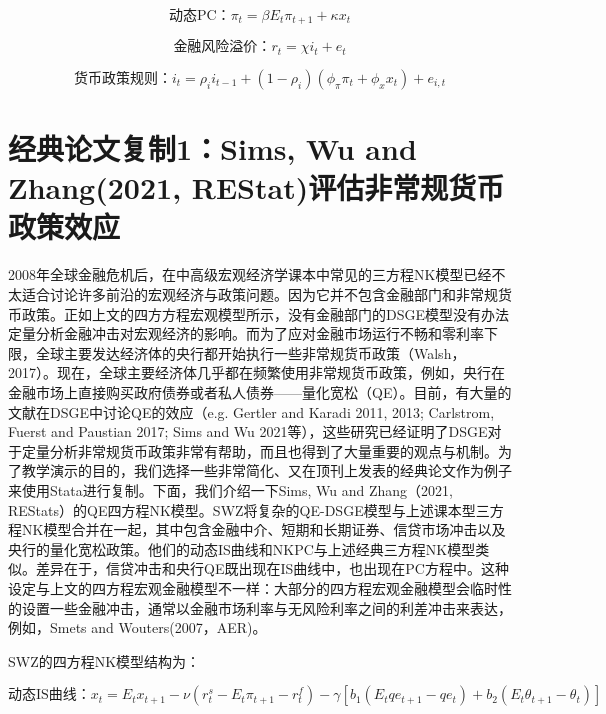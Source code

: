 \documentclass[cn,12pt,math=newtx,citestyle=gb7714-2015,bibstyle=gb7714-2015]{elegantbook}
\begin{document}
	
	\begin{equation}
		\text{动态PC：}\pi_t =\beta E_t \pi_{t+1} + \kappa x_t
	\end{equation}
	
		\begin{equation}
		\text{金融风险溢价：}r_t =\chi i_{t} + e_t
	\end{equation}
	
	\begin{equation}
		\text{货币政策规则：} i_t =\rho_i i_{t-1} + (1-\rho_i)(\phi_\pi \pi_{t} + \phi_x x_t) + e_{i,t}
	\end{equation}
	
		
	
	\section{经典论文复制1：Sims, Wu and Zhang(2021, REStat)评估非常规货币政策效应}
	
	2008年全球金融危机后，在中高级宏观经济学课本中常见的三方程NK模型已经不太适合讨论许多前沿的宏观经济与政策问题。因为它并不包含金融部门和非常规货币政策。正如上文的四方方程宏观模型所示，没有金融部门的DSGE模型没有办法定量分析金融冲击对宏观经济的影响。而为了应对金融市场运行不畅和零利率下限，全球主要发达经济体的央行都开始执行一些非常规货币政策（Walsh，2017）。现在，全球主要经济体几乎都在频繁使用非常规货币政策，例如，央行在金融市场上直接购买政府债券或者私人债券——量化宽松（QE）。目前，有大量的文献在DSGE中讨论QE的效应（e.g. Gertler and Karadi 2011, 2013; Carlstrom, Fuerst and Paustian 2017; Sims and Wu 2021等），这些研究已经证明了DSGE对于定量分析非常规货币政策非常有帮助，而且也得到了大量重要的观点与机制。为了教学演示的目的，我们选择一些非常简化、又在顶刊上发表的经典论文作为例子来使用Stata进行复制。下面，我们介绍一下Sims, Wu and Zhang（2021, REStats）的QE四方程NK模型。SWZ将复杂的QE-DSGE模型与上述课本型三方程NK模型合并在一起，其中包含金融中介、短期和长期证券、信贷市场冲击以及央行的量化宽松政策。他们的动态IS曲线和NKPC与上述经典三方程NK模型类似。差异在于，信贷冲击和央行QE既出现在IS曲线中，也出现在PC方程中。这种设定与上文的四方程宏观金融模型不一样：大部分的四方程宏观金融模型会临时性的设置一些金融冲击，通常以金融市场利率与无风险利率之间的利差冲击来表达，例如，Smets and Wouters(2007，AER)。
	
	SWZ的四方程NK模型结构为：
	
		\begin{equation}
		\text{动态IS曲线：}x_t = E_t x_{t+1} - \nu(r_t^s - E_t\pi_{t+1} - r_t^f) - \gamma[b_1(E_t qe_{t+1} - qe_t)+b_2(E_t \theta_{t+1}-\theta_t)]
	\end{equation}
	
\end{document}
